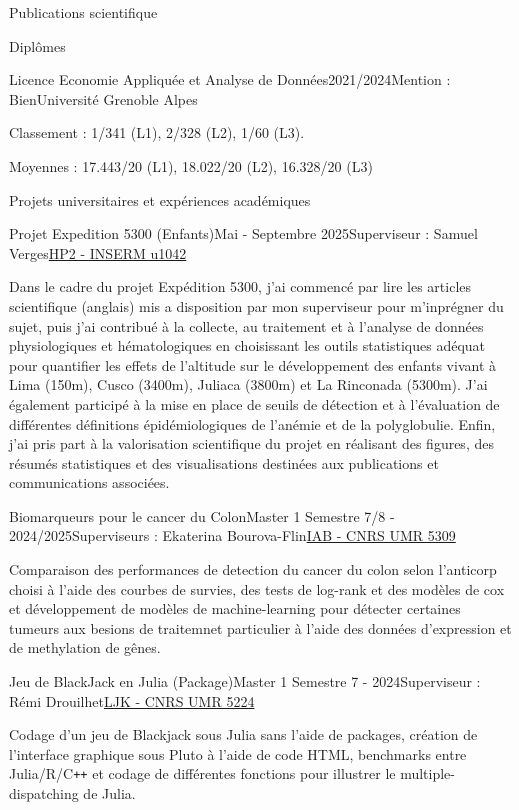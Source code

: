 \documentclass[11pt,]{resume}
\begin{document}
\begin{rSection}{Publications scientifique}
\begin{rSection}{Diplômes}
	\begin{rSubsection}{Licence Economie Appliquée et Analyse de Données}{2021/2024}{Mention : Bien}{Université Grenoble Alpes}
		\item Classement : 1/341 (L1), 2/328 (L2), 1/60 (L3).
		\item Moyennes : 17.443/20 (L1), 18.022/20 (L2), 16.328/20 (L3)
	\end{rSubsection}

\end{rSection}

\begin{rSection}{Projets universitaires et expériences académiques}

	\begin{rSubsection}{Projet Expedition 5300 (Enfants)}{Mai - Septembre 2025}{Superviseur : Samuel Verges}{\href{https://hp2.univ-grenoble-alpes.fr/fr}{HP2 - INSERM u1042}}
		\item Dans le cadre du projet Expédition 5300, j’ai commencé par lire les articles scientifique (anglais) mis a disposition par mon superviseur pour m'inprégner du sujet, puis j'ai contribué à la collecte, au traitement et à l’analyse de données physiologiques et hématologiques en choisissant les outils statistiques adéquat pour quantifier les effets de l’altitude sur le développement des enfants vivant à Lima (150m), Cusco (3400m), Juliaca (3800m) et La Rinconada (5300m). J’ai également participé à la mise en place de seuils de détection et à l’évaluation de différentes définitions épidémiologiques de l'anémie et de la polyglobulie. Enfin, j’ai pris part à la valorisation scientifique du projet en réalisant des figures, des résumés statistiques et des visualisations destinées aux publications et communications associées.
	\end{rSubsection}
\newpage
	\begin{rSubsection}{Biomarqueurs pour le cancer du Colon}{Master 1 Semestre 7/8 - 2024/2025}{Superviseurs : Ekaterina Bourova-Flin}{\href{https://iab-grenoble.fr/}{IAB - CNRS UMR 5309}}
		\item Comparaison des performances de detection du cancer du colon selon l'anticorp choisi à l'aide des courbes de survies, des tests de log-rank et des modèles de cox et développement de modèles de machine-learning pour détecter certaines tumeurs aux besions de traitemnet particulier à l'aide des données d'expression et de methylation de gênes.
	\end{rSubsection}

	\begin{rSubsection}{Jeu de BlackJack en Julia (Package)}{Master 1 Semestre 7 - 2024}{Superviseur : Rémi Drouilhet}{\href{https://www-ljk.imag.fr/}{LJK - CNRS UMR 5224}}
		\item Codage d'un jeu de Blackjack sous Julia sans l'aide de packages, création de l'interface graphique sous Pluto à l'aide de code HTML, benchmarks entre Julia/R/C\texttt{++} et codage de différentes fonctions pour illustrer le multiple-dispatching de Julia.
	\end{rSubsection}


\end{rSection}
\end{rSection}
\end{document}
